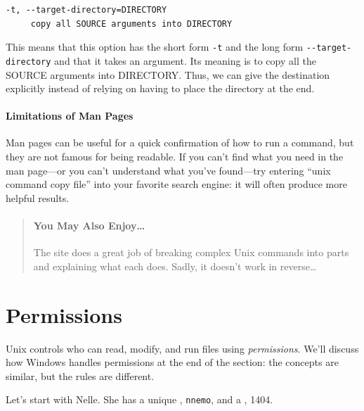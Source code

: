 \documentclass{book}
\begin{document}
\begin{verbatim}
-t, --target-directory=DIRECTORY
     copy all SOURCE arguments into DIRECTORY
\end{verbatim}

This means that this option has the short form \texttt{-t} and the long
form \texttt{-{}-target-directory} and that it takes an argument. Its
meaning is to copy all the SOURCE arguments into DIRECTORY. Thus, we can
give the destination explicitly instead of relying on having to place
the directory at the end.

\mbox{}\paragraph{Limitations of Man Pages}

Man pages can be useful for a quick confirmation of how to run a
command, but they are not famous for being readable. If you can't find
what you need in the man page---or you can't understand what you've
found---try entering ``unix command copy file'' into your favorite
search engine: it will often produce more helpful results.

\begin{quote}
\mbox{}\paragraph{You May Also Enjoy\ldots{}}

The  site does a great
job of breaking complex Unix commands into parts and explaining what
each does. Sadly, it doesn't work in reverse\ldots{}
\end{quote}

\section{Permissions}

Unix controls who can read, modify, and run files using
\emph{permissions}. We'll discuss how Windows handles permissions at the
end of the section: the concepts are similar, but the rules are
different.

Let's start with Nelle. She has a unique , \texttt{nnemo}, and a , 1404.
\end{document}
